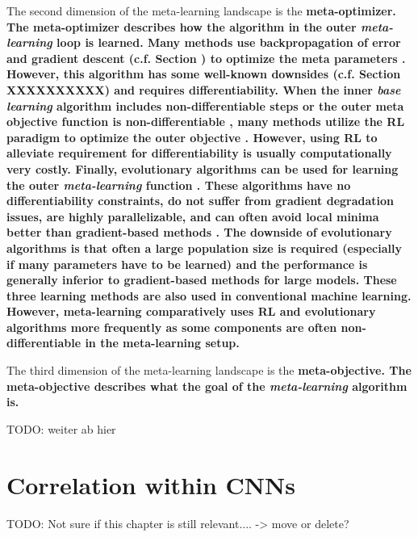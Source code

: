 The second dimension of the meta-learning landscape is the \bf{meta-optimizer}.
The meta-optimizer describes how the algorithm in the outer \emph{meta-learning} loop is learned.
Many methods use backpropagation of error and gradient descent (c.f. Section ) to optimize the meta parameters \cite{ravi2016optimization, 10-5555-3305381-3305498, li2019feature, 10-5555-3305381-3305502, pmlr-v80-franceschi18a, Micaelli_Storkey_2021, 189, pmlr-v108-lorraine20a}.
However, this algorithm has some well-known downsides (c.f. Section XXXXXXXXXX) and requires differentiability.
When the inner \emph{base learning} algorithm includes non-differentiable steps \cite{Cubuk_2019_CVPR} or the outer meta objective function is non-differentiable \cite{huang2019addressing}, many methods utilize the RL paradigm to optimize the outer objective \cite{Duan_Schulman_Chen_Bartlett_Sutskever_Abbeel_2016}.
However, using RL to alleviate requirement for differentiability is usually computationally very costly.
Finally, evolutionary algorithms can be used for learning the outer \emph{meta-learning} function \cite{schmidhuber-1987, Stanley_Clune_Lehman_Miikkulainen_2019, Salimans_Ho_Chen_Sidor_Sutskever_2017}.
These algorithms have no differentiability constraints, do not suffer from gradient degradation issues, are highly parallelizable, and can often avoid local minima better than gradient-based methods \cite{Salimans_Ho_Chen_Sidor_Sutskever_2017}.
The downside of evolutionary algorithms is that often a large population size is required (especially if many parameters have to be learned) and the performance is generally inferior to gradient-based methods for large models.
These three learning methods are also used in conventional machine learning.
However, meta-learning comparatively uses RL and evolutionary algorithms more frequently as some components are often non-differentiable in the meta-learning setup.

The third dimension of the meta-learning landscape is the \bf{meta-objective}.
The meta-objective describes what the goal of the \emph{meta-learning} algorithm is.

TODO: weiter ab hier







\section{Correlation within CNNs}

TODO: Not sure if this chapter is still relevant.... -> move or delete?

